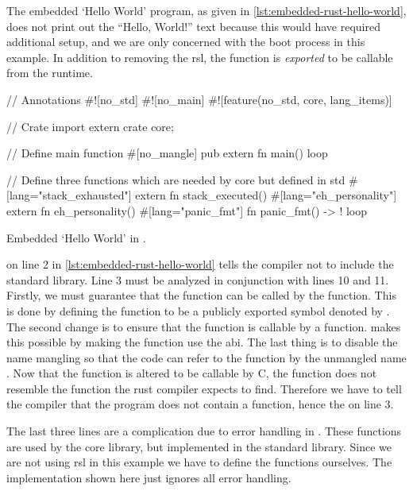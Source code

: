 The embedded `Hello World' program, as given in \autoref{lst:embedded-rust-hello-world}, does not print out the ``Hello, World!'' text because this would have required additional setup, and we are only concerned with the boot process in this example.
In addition to removing the \gls{rsl}, the {\main} function is \emph{exported} to be callable from the {\C} runtime.

\begin{listing}[H]
  \begin{rustcode}
// Annotations
#![no_std]
#![no_main]
#![feature(no_std, core, lang_items)]

// Crate import
extern crate core;

// Define main function
#[no_mangle]
pub extern fn main() {
  loop {}
}

// Define three functions which are needed by core but defined in std
#[lang="stack_exhausted"] extern fn stack_executed() {}
#[lang="eh_personality"] extern fn eh_personality() {}
#[lang="panic_fmt"] fn panic_fmt() -> ! { loop {} }
\end{rustcode}
\caption{Embedded `Hello World' in {\rust}.}
\label{lst:embedded-rust-hello-world}
\end{listing}

\attrib{\#\![no\_std]} on line 2 in \autoref{lst:embedded-rust-hello-world} tells the {\rust} compiler not to include the standard library.
Line 3 must be analyzed in conjunction with lines 10 and 11.
Firstly, we must guarantee that the function can be called by the  function.
This is done by defining the {\main} function to be a publicly exported symbol denoted by .
The second change is to ensure that the function is callable by a {\C} function.
 makes this possible by making the function use the {\C} \gls{abi}.
The last thing is to disable the {\rust} name mangling so that the {\C} code can refer to the function by the unmangled name {\main}.
Now that the {\main} function is altered to be callable by C, the function does not resemble the function the rust compiler expects to find.
Therefore we have to tell the compiler that the program does not contain a {\main} function, hence the \attrib{\#\![no\_main]} on line 3.

The last three lines are a complication due to error handling in {\rust}.
These functions are used by the core library, but implemented in the standard library.
Since we are not using \gls{rsl} in this example we have to define the functions ourselves.
The implementation shown here just ignores all error handling.

